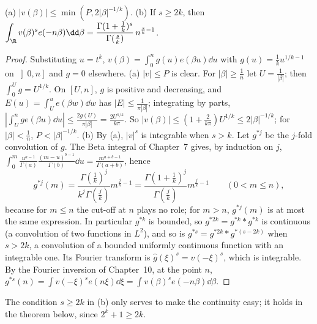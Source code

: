 \begin{lemma}\label{lem:singint}
(a) $|v(\beta)|\le\min(P,2|\beta|^{-1/k})$.
(b) If $s\ge2k$, then $\displaystyle\int_\R v(\beta)^se(-n\beta)\dd\beta=\frac{\Gamma(1+\frac1k)^s}{\Gamma(\frac sk)}\,n^{\frac sk-1}$.
\end{lemma}
\begin{proof}
Substituting $u=t^k$, $v(\beta)=\int_0^ng(u)e(\beta u)\dd u$ with $g(u)=\frac1ku^{1/k-1}$ on $\left]0,n\right]$ and $g=0$ elsewhere.
(a) $|v|\le P$ is clear. For $|\beta|\ge\frac1n$ let $U=\frac1{|\beta|}$; then $\int_0^Ug=U^{1/k}$. On $[U,n]$, $g$ is positive and decreasing, and $E(u)=\int_U^ue(\beta w)\dd w$ has $|E|\le\frac1{\pi|\beta|}$; integrating by parts, $|\int_U^nge(\beta u)\dd u|\le\frac{2g(U)}{\pi|\beta|}=\frac{2U^{1/k}}{k\pi}$. So $|v(\beta)|\le(1+\frac2{k\pi})U^{1/k}\le2|\beta|^{-1/k}$; for $|\beta|<\frac1n$, $P<|\beta|^{-1/k}$.
(b) By (a), $|v|^s$ is integrable when $s>k$. Let $g^{*j}$ be the $j$-fold convolution of $g$. The Beta integral of Chapter~7 gives, by induction on $j$, $\int_0^m\frac{u^{a-1}}{\Gamma(a)}\frac{(m-u)^{b-1}}{\Gamma(b)}\dd u=\frac{m^{a+b-1}}{\Gamma(a+b)}$, hence
\[
g^{*j}(m)=\frac{\Gamma(\frac1k)^j}{k^j\Gamma(\frac jk)}m^{\frac jk-1}=\frac{\Gamma(1+\frac1k)^j}{\Gamma(\frac jk)}m^{\frac jk-1}\qquad(0<m\le n),
\]
because for $m\le n$ the cut-off at $n$ plays no role; for $m>n$, $g^{*j}(m)$ is at most the same expression. In particular $g^{*k}$ is bounded, so $g^{*2k}=g^{*k}*g^{*k}$ is continuous (a convolution of two functions in $L^2$), and so is $g^{*s}=g^{*2k}*g^{*(s-2k)}$ when $s>2k$, a convolution of a bounded uniformly continuous function with an integrable one. Its Fourier transform is $\hat g(\xi)^s=v(-\xi)^s$, which is integrable. By the Fourier inversion of Chapter~10, at the point $n$, $g^{*s}(n)=\int v(-\xi)^se(n\xi)\dd\xi=\int v(\beta)^se(-n\beta)\dd\beta$.
\end{proof}

The condition $s\ge2k$ in (b) only serves to make the continuity easy; it holds in the theorem below, since $2^k+1\ge2k$.

